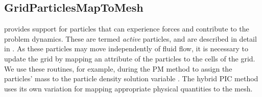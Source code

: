 


\subsection{GridParticlesMapToMesh}
\label{Sec:GridParticlesMapToMesh}
\flashx provides support for particles that can experience forces
and contribute to the problem dynamics.  These are termed
\emph{active} particles, and are described in detail in
.  As these particles may move independently of
fluid flow, it is necessary to update the grid by mapping an attribute
of the particles to the cells of the grid.  We use these routines, for
example, during the PM method to assign the particles' mass to the
particle density solution variable . The hybrid PIC method 
uses its own variation for mapping appropriate physical quantities to
the mesh.

